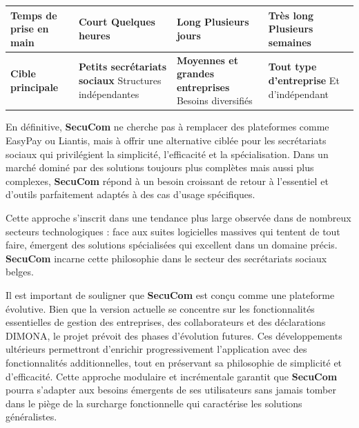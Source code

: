 \begin{table}[H]
{\begin{tabular}{p{3.2cm}p{4.2cm}p{4.2cm}p{4.2cm}}
\textbf{Temps de prise en main} & 
\textcolor{green!70!black}{\small\textbf{Court}} \newline
\small{Quelques heures} & 
\textcolor{orange!70!black}{\small\textbf{Long}} \newline
\small{Plusieurs jours} & 
\textcolor{red!70!black}{\small\textbf{Très long}} \newline
\small{Plusieurs semaines} \\
\midrule

\textbf{Cible principale} & 
\textbf{Petits secrétariats sociaux} \newline
\small{Structures indépendantes} & 
\textbf{Moyennes et grandes entreprises} \newline
\small{Besoins diversifiés} & 
\textbf{Tout type d'entreprise} \newline
\small{Et d'indépendant} \\
\bottomrule
\end{tabular}%
}
\end{table}

\vspace{0.5cm}

\noindent En définitive, \textbf{SecuCom} ne cherche pas à remplacer des plateformes comme EasyPay ou Liantis, mais à offrir une alternative ciblée pour les secrétariats sociaux qui privilégient la simplicité, l'efficacité et la spécialisation. Dans un marché dominé par des solutions toujours plus complètes mais aussi plus complexes, \textbf{SecuCom} répond à un besoin croissant de retour à l'essentiel et d'outils parfaitement adaptés à des cas d'usage spécifiques.

\vspace{1cm}
\begin{note}
Cette approche s'inscrit dans une tendance plus large observée dans de nombreux secteurs technologiques : face aux suites logicielles massives qui tentent de tout faire, émergent des solutions spécialisées qui excellent dans un domaine précis. \textbf{SecuCom} incarne cette philosophie dans le secteur des secrétariats sociaux belges.
\end{note}

\begin{tcolorbox}[
  title={\textbf{Évolutivité de SecuCom}},
  colback=blue!5!white,
  colframe=primarycolor,
  fonttitle=\bfseries,
  boxrule=0.5mm,
  arc=2mm,
  left=6mm,
  right=6mm,
  top=6mm,
  bottom=6mm
]
\noindent Il est important de souligner que \textbf{SecuCom} est conçu comme une plateforme évolutive. Bien que la version actuelle se concentre sur les fonctionnalités essentielles de gestion des entreprises, des collaborateurs et des déclarations DIMONA, le projet prévoit des phases d'évolution futures. Ces développements ultérieurs permettront d'enrichir progressivement l'application avec des fonctionnalités additionnelles, tout en préservant sa philosophie de simplicité et d'efficacité. Cette approche modulaire et incrémentale garantit que \textbf{SecuCom} pourra s'adapter aux besoins émergents de ses utilisateurs sans jamais tomber dans le piège de la surcharge fonctionnelle qui caractérise les solutions généralistes.
\end{tcolorbox}
